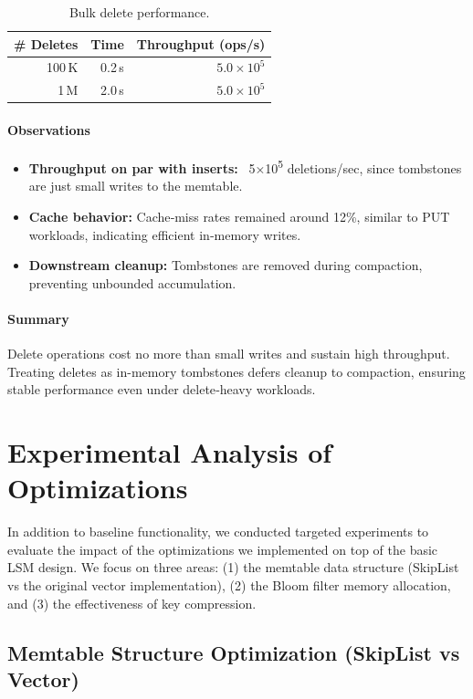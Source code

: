 \documentclass[10pt]{article}
\begin{document}
\begin{table}[htbp]
  \centering
  \small
  \begin{tabular}{r r r}
    \toprule
    \# Deletes & Time & Throughput (ops/s) \\
    \midrule
    100\,K & 0.2\,s & $5.0\times10^5$ \\
    1\,M   & 2.0\,s & $5.0\times10^5$ \\
    \bottomrule
  \end{tabular}
  \caption{Bulk delete performance.}
  \label{tab:delete_perf}
\end{table}

\paragraph{Observations}
\begin{itemize}[itemsep=0.5ex]
  \item \textbf{Throughput on par with inserts:} ~5×10\textsuperscript{5} deletions/sec, since tombstones are just small writes to the memtable.
  \item \textbf{Cache behavior:} Cache‐miss rates remained around 12\%, similar to PUT workloads, indicating efficient in‐memory writes.
  \item \textbf{Downstream cleanup:} Tombstones are removed during compaction, preventing unbounded accumulation.
\end{itemize}

\paragraph{Summary}
Delete operations cost no more than small writes and sustain high throughput. Treating deletes as in-memory tombstones defers cleanup to compaction, ensuring stable performance even under delete‐heavy workloads.  

\section{Experimental Analysis of Optimizations}

In addition to baseline functionality, we conducted targeted experiments to evaluate the impact of the optimizations we implemented on top of the basic LSM design. We focus on three areas: (1) the memtable data structure (SkipList vs the original vector implementation), (2) the Bloom filter memory allocation, and (3) the effectiveness of key compression.

\subsection{Memtable Structure Optimization (SkipList vs Vector)}
\end{document}
